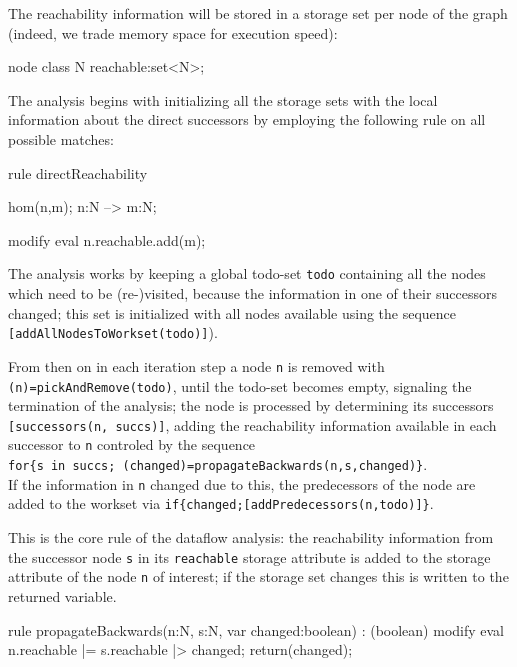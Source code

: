The reachability information will be stored in a storage set per node of the graph (indeed, we trade memory space for execution speed):
  \begin{example}
    \begin{grgen}
node class N
{
	reachable:set<N>;
}
    \end{grgen}
  \end{example}

The analysis begins with initializing all the storage sets with the local information about the direct successors by employing the following rule on all possible matches:
  \begin{example}
    \begin{grgen}
rule directReachability
{
  hom(n,m);
  n:N --> m:N;

  modify {
    eval { n.reachable.add(m); }
  }
}
    \end{grgen}
  \end{example}

The analysis works by keeping a global todo-set \verb#todo# containing all the nodes which need to be (re-)visited,
because the information in one of their successors changed;
this set is initialized with all nodes available using the sequence \verb#[addAllNodesToWorkset(todo)]#).

From then on in each iteration step a node \verb#n# is removed with \verb#(n)=pickAndRemove(todo)#, until the todo-set becomes empty, signaling the termination of the analysis; the node is processed by determining its successors \verb#[successors(n, succs)]#, adding the reachability information available in each successor to \verb#n# controled by the sequence\\
\verb#for{s in succs; (changed)=propagateBackwards(n,s,changed)}#.\\
If the information in \verb#n# changed due to this, the predecessors of the node are added to the workset via \verb#if{changed;[addPredecessors(n,todo)]}#.

  \begin{example}
This is the core rule of the dataflow analysis: the reachability information from the successor node \texttt{s} in its \texttt{reachable} storage attribute is added to the storage attribute of the node \texttt{n} of interest; if the storage set changes this is written to the returned variable.
    \begin{grgen}
rule propagateBackwards(n:N, s:N, var changed:boolean) : (boolean)
{
  modify {
    eval { n.reachable |= s.reachable |> changed; }
    return(changed);
  }
}
    \end{grgen}
  \end{example}

